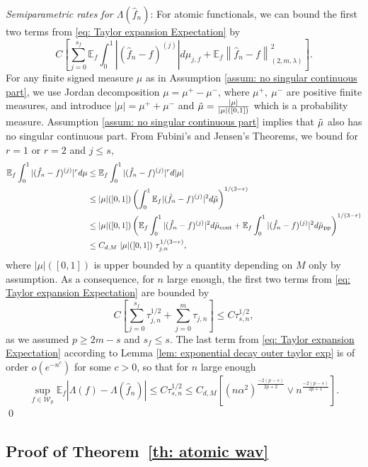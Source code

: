 \documentclass[preprint]{imsart}
\newcommand\norm[1]{\left\lVert#1\right\rVert}
\numberwithin{equation}{section}
\begin{document}
\begin{appendix}
\textit{Semiparametric rates for $\Lambda(\hat{f}_n)$}: For atomic functionals, we can bound the first two terms from \eqref{eq: Taylor expansion Expectation} by
\[C\left[\sum_{j=0}^{s_f} \mathbb{E}_f  \int_0^1 \left|(\hat{f}_n-f)^{(j)}\right|d\mu_{j,f} + \mathbb{E}_f \norm{\hat{f}_n-f}_{(2,m,\lambda)}^2 \right].\]
For any finite signed measure $\mu$ as in Assumption \ref{assum: no singular continuous part}, we use Jordan decomposition $\mu= \mu^+ - \mu^-$, where $\mu^+,\ \mu^-$ are positive finite measures, and introduce $|\mu|= \mu^+ + \mu^-$ and $\Tilde{\mu}= \frac{|\mu|}{|\mu|([0,1])}$ which is a probability measure. Assumption \ref{assum: no singular continuous part} implies that $\Tilde{\mu}$ also has no singular continuous part. From Fubini's and Jensen's Theorems, we bound for $r=1$ or $r=2$ and $j\leq s$,
\begin{align*}
\mathbb{E}_f\int_0^1 |(\hat{f}_n-f)^{(j)}|^rd\mu&\leq \mathbb{E}_f\int_0^1 |(\hat{f}_n-f)^{(j)}|^rd|\mu|\\
&\leq |\mu|([0,1]) \left(\int_0^1 \mathbb{E}_f|(\hat{f}_n-f)^{(j)}|^2 d\Tilde{\mu} \right)^{1/(3-r)}\\
&\leq |\mu|([0,1]) \left(\mathbb{E}_f\int_0^1 |(\hat{f}_n-f)^{(j)}|^2 d\Tilde{\mu}_{\text{cont}} + \mathbb{E}_f \int_0^1 |(\hat{f}_n-f)^{(j)}|^2 d\Tilde{\mu}_{\text{pp}} \right)^{1/(3-r)}\\
&\leq C_{d,M}\ |\mu|([0,1])\ \tau_{j,n}^{1/(3-r)},
\end{align*}
where $|\mu|([0,1])$ is upper bounded by a quantity depending on $M$ only by assumption. As a consequence, for $n$ large enough, the first two terms from \eqref{eq: Taylor expansion Expectation} are bounded by
\[C\left[\sum_{j=0}^{s_f} \tau_{j,n}^{1/2} + \sum_{j=0}^{m}\tau_{j,n} \right]\leq C\tau_{s,n}^{1/2},\]
as we assumed $p\geq 2m-s$ and $s_f\leq s$. The last term from \eqref{eq: Taylor expansion Expectation} according to Lemma \ref{lem: exponential decay outer taylor exp} is of order $o(e^{-n^c})$ for some $c>0$, so that for $n$ large enough
\[\underset{f\in\mathcal{W}_p}{\sup}\mathbb{E}_f|\Lambda(f)-\Lambda(\hat{f}_n)|\leq C\tau^{1/2}_{s,n}\leq C_{d,M}\left[(n\alpha^2)^{\frac{-2(p-s)}{2p+2}}\vee n^{\frac{-2(p-s)}{2p+1}} \right].\]
\hfill\qed





\subsection{Proof of Theorem~\ref{th: atomic wav}}



\end{appendix}
\end{document}

